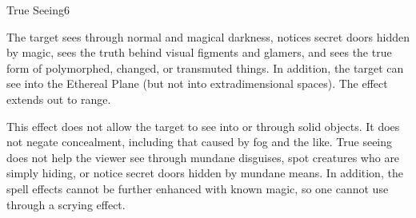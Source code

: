 \begin{spellsection}{True Seeing}{6}
\begin{spellheader}
    \begin{spelltargetinginfo}
    \end{spelltargetinginfo}
\end{spellheader}
\begin{spellcontent}
    \begin{spelleffects}
        \spelleffect The target sees through normal and magical darkness, notices secret doors hidden by magic, sees the truth behind visual figments and glamers, and sees the true form of polymorphed, changed, or transmuted things. In addition, the target can see into the Ethereal Plane (but not into extradimensional spaces). The effect extends out to \rngmed range.
        \spelldur \durshort
    \end{spelleffects}
\end{spellcontent}
\begin{spellfooter}
    \spellnotes This effect does not allow the target to see into or through solid objects. It does not negate concealment, including that caused by fog and the like. True seeing does not help the viewer see through mundane disguises, spot creatures who are simply hiding, or notice secret doors hidden by mundane means. In addition, the spell effects cannot be further enhanced with known magic, so one cannot use  through a scrying effect.
\end{spellfooter}
\end{spellsection}

